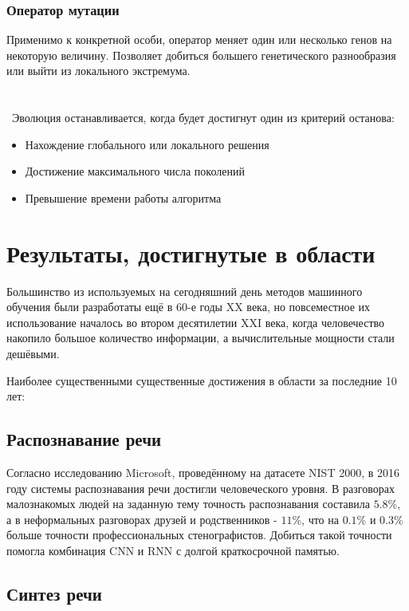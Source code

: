 \documentclass{article}
\begin{document}
        \subsubsection*{Оператор мутации}
            Применимо к конкретной особи, оператор меняет один или несколько генов на некоторую величину. Позволяет добиться большего генетического разнообразия или выйти из локального экстремума.
        \\\\\\\
        Эволюция останавливается, когда будет достигнут один из критерий останова:
        \begin{itemize}
            \item Нахождение глобального или локального решения
            \item Достижение максимального числа поколений
            \item Превышение времени работы алгоритма
        \end{itemize}

\section*{Результаты, достигнутые в области}
    Большинство из используемых на сегодняшний день методов машинного обучения были разработаты ещё в 60-е годы XX века, но повсеместное их использование началось во втором десятилетии XXI века, когда человечество накопило большое количество информации, а вычислительные мощности стали дешёвыми.
    
    Наиболее существенными существенные достижения в области за последние 10 лет: 
    
    \subsection*{Распознавание речи}
            Согласно исследованию Microsoft\citep{xiong2016achieving}, проведённому на датасете NIST 2000, в 2016 году системы распознавания речи достигли человеческого уровня. В разговорах малознакомых людей на заданную тему точность распознавания составила $5.8\%$, а в неформальных разговорах друзей и родственников - $11\%$, что на $0.1\%$ и $0.3\%$ больше точности профессиональных стенографистов. Добиться такой точности помогла комбинация CNN и RNN с долгой краткосрочной памятью.
            
    \subsection*{Синтез речи}
    
\end{document}
